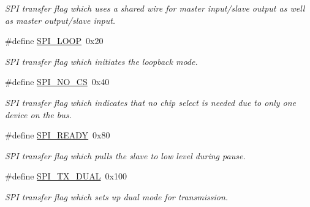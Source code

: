 \begin{DoxyCompactItemize}
\begin{DoxyCompactList}\small\item\em S\+PI transfer flag which uses a shared wire for master input/slave output as well as master output/slave input. \end{DoxyCompactList}\item 
\mbox{\label{group__SPILinux_ga9d487b81fecf6a9e9ce1225cac916429}} 
\#define \mbox{\hyperlink{group__SPILinux_ga9d487b81fecf6a9e9ce1225cac916429}{S\+P\+I\+\_\+\+L\+O\+OP}}~0x20
\begin{DoxyCompactList}\small\item\em S\+PI transfer flag which initiates the loopback mode. \end{DoxyCompactList}\item 
\mbox{\label{group__SPILinux_ga97bfe367333ebc63ef4660214a75650d}} 
\#define \mbox{\hyperlink{group__SPILinux_ga97bfe367333ebc63ef4660214a75650d}{S\+P\+I\+\_\+\+N\+O\+\_\+\+CS}}~0x40
\begin{DoxyCompactList}\small\item\em S\+PI transfer flag which indicates that no chip select is needed due to only one device on the bus. \end{DoxyCompactList}\item 
\mbox{\label{group__SPILinux_gad47e24b1cd1e44e0e7b25e4a8c421d37}} 
\#define \mbox{\hyperlink{group__SPILinux_gad47e24b1cd1e44e0e7b25e4a8c421d37}{S\+P\+I\+\_\+\+R\+E\+A\+DY}}~0x80
\begin{DoxyCompactList}\small\item\em S\+PI transfer flag which pulls the slave to low level during pause. \end{DoxyCompactList}\item 
\mbox{\label{group__SPILinux_ga684a5e746862043422b32b6bacb5d7d5}} 
\#define \mbox{\hyperlink{group__SPILinux_ga684a5e746862043422b32b6bacb5d7d5}{S\+P\+I\+\_\+\+T\+X\+\_\+\+D\+U\+AL}}~0x100
\begin{DoxyCompactList}\small\item\em S\+PI transfer flag which sets up dual mode for transmission. \end{DoxyCompactList}\item 
\mbox{\label{group__SPILinux_gab627befc80be3595ab5613aeeef20c5e}} 

\end{DoxyCompactItemize}

